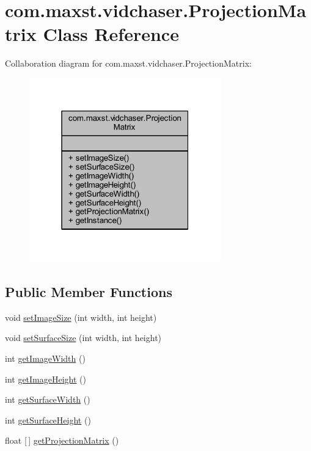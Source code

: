 \hypertarget{classcom_1_1maxst_1_1vidchaser_1_1_projection_matrix}{}\section{com.\+maxst.\+vidchaser.\+Projection\+Matrix Class Reference}
\label{classcom_1_1maxst_1_1vidchaser_1_1_projection_matrix}


Collaboration diagram for com.\+maxst.\+vidchaser.\+Projection\+Matrix\+:\nopagebreak
\begin{figure}[H]
\begin{center}
\leavevmode
\includegraphics[width=235pt]{classcom_1_1maxst_1_1vidchaser_1_1_projection_matrix__coll__graph}
\end{center}
\end{figure}
\subsection*{Public Member Functions}
\begin{DoxyCompactItemize}
\item 
void \hyperlink{classcom_1_1maxst_1_1vidchaser_1_1_projection_matrix_ae450d0b28bfdb52b38989da684a9d29e}{set\+Image\+Size} (int width, int height)
\item 
void \hyperlink{classcom_1_1maxst_1_1vidchaser_1_1_projection_matrix_a64bdf3583a8aede82bb6fc6721346134}{set\+Surface\+Size} (int width, int height)
\item 
int \hyperlink{classcom_1_1maxst_1_1vidchaser_1_1_projection_matrix_a1e07354294afffdb44a61c7b7659e1fa}{get\+Image\+Width} ()
\item 
int \hyperlink{classcom_1_1maxst_1_1vidchaser_1_1_projection_matrix_a72e65465d3d38d1ef4f6bf187e72bf71}{get\+Image\+Height} ()
\item 
int \hyperlink{classcom_1_1maxst_1_1vidchaser_1_1_projection_matrix_a38b58ba2ddfd831dc86e6e92fb2fde10}{get\+Surface\+Width} ()
\item 
int \hyperlink{classcom_1_1maxst_1_1vidchaser_1_1_projection_matrix_a5db288183b110be0e8e403d90eed4a74}{get\+Surface\+Height} ()
\item 
float \mbox{[}$\,$\mbox{]} \hyperlink{classcom_1_1maxst_1_1vidchaser_1_1_projection_matrix_adddc52ee86b60d61eafbcca0bedc9386}{get\+Projection\+Matrix} ()
\end{DoxyCompactItemize}
